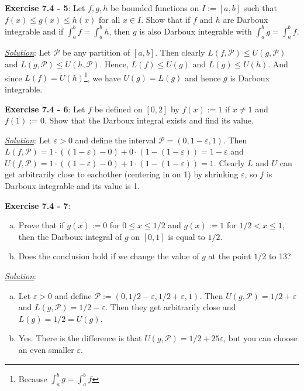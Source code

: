 \documentclass{article}
\newcommand{\sP}{\mathcal P}
\begin{document}
\hrulefill

\textbf{Exercise 7.4 - 5}:
Let $f, g, h$ be bounded functions on $I := [a, b]$ such that
$f(x) \leq g(x) \leq h(x)$ for all $x \in I$. Show that if $f$ and $h$ are
Darboux integrable and if $\int_a^b f = \int_a^b h$, then $g$ is also
Darboux integrable with $\int_a^b g = \int_a^b f$.

\underline{\textit{Solution}}:
Let $\sP$ be any partition of $[a, b]$. Then clearly
$L(f, \sP) \leq U(g, \sP)$ and $L(g, \sP) \leq U(h, \sP)$. Hence,
$L(f) \leq U(g)$ and $L(g) \leq U(h)$. And since
$L(f) = U(h)$\footnote{Because $\int_a^b g = \int_a^b f$}, we have
$U(g) = L(g)$ and hence $g$ is Darboux integrable.

\hrulefill

\textbf{Exercise 7.4 - 6}:
Let $f$ be defined on $[0, 2]$ by $f(x) := 1$ if $x \not= 1$ and
$f(1) := 0$. Show that the Darboux integral exists and find its value.

\underline{\textit{Solution}}:
Let $\varepsilon > 0$ and define the interval
$\sP = (0, 1 - \varepsilon, 1)$. Then
$L(f, \sP) = 1 \cdot ((1 - \varepsilon) - 0)
+ 0 \cdot (1 - (1 - \varepsilon)) = 1 - \varepsilon$ and
$U(f, \sP) = 1 \cdot ((1 - \varepsilon) - 0)
+ 1 \cdot (1 - (1 - \varepsilon)) = 1$. Clearly $L$ and $U$ can get
arbitrarily close to eachother (centering in on 1) by shrinking
$\varepsilon$, so $f$ is Darboux integrable and its value is 1.

\hrulefill

\textbf{Exercise 7.4 - 7}:
\begin{enumerate}[(a)]
  \item Prove that if $g(x) := 0$ for $0 \leq x \leq 1/2$ and
    $g(x) := 1$ for $1/2 < x \leq 1$, then the Darboux integral of
    $g$ on $[0, 1]$ is equal to $1/2$.
  \item Does the conclusion hold if we change the value of $g$ at the point
    $1/2$ to 13?
\end{enumerate}

\underline{\textit{Solution}}:
\begin{enumerate}[(a)]
  \item Let $\varepsilon > 0$ and define
    $\sP := (0, 1/2 - \varepsilon, 1/2 + \varepsilon, 1)$. Then
    $U(g, \sP) = 1/2 + \varepsilon$ and $L(g, \sP) = 1/2 - \varepsilon$.
    Then they get arbitrarily close and $L(g) = 1/2 = U(g)$.
  \item Yes. There is the difference is that
    $U(g, \sP) = 1/2 + 25\varepsilon$, but you can choose an even smaller
    $\varepsilon$.
\end{enumerate}
\end{document}
